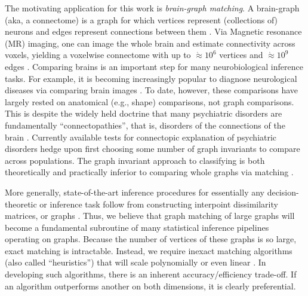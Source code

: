 \documentclass[11pt]{article}
\begin{document}
The motivating application for this work is \emph{brain-graph matching}.  A brain-graph (aka, a connectome) is a graph for which vertices represent (collections of) neurons and edges represent connections between them \cite{SpornsKotter05, Hagmann05}. Via  Magnetic resonance (MR) imaging, one can image the whole brain and estimate connectivity across voxels, yielding a voxelwise connectome with up to $\dot{\approx} 10^6$ vertices and $\dot{\approx} 10^9$ edges \cite{Zuo2011}.  Comparing brains is an important step for many neurobiological inference tasks.  For example, it is becoming increasingly popular to diagnose neurological diseases via comparing brain images \cite{Csernansky2004}.  To date, however, these comparisons have largely rested on anatomical (e.g., shape) comparisons, not graph comparisons.  This is despite the widely held doctrine that many
psychiatric disorders are fundamentally ``connectopathies'', that is, disorders of the connections of the brain \cite{Kubicki2007,Calhoun2011,Fornito2012,Fornito2012a}. Currently available tests for connectopic explanation of psychiatric disorders  hedge upon first choosing some number of graph invariants to compare across populations. The graph invariant approach to classifying is both theoretically and practically inferior to comparing whole graphs via matching \cite{VP11_unlabeled}.  

More generally, state-of-the-art inference procedures for essentially any decision-theoretic or inference task follow from constructing interpoint dissimilarity matrices, or graphs \cite{Duin2011}.  Thus, we believe that graph matching of large graphs will become a fundamental subroutine of many statistical inference pipelines operating on graphs. Because the number of vertices of these graphs is so large, exact matching is intractable.   Instead, we require inexact matching algorithms (also called ``heuristics'') that will scale polynomially or even linear \cite{Conte2004}.  In developing such algorithms, there is an inherent accuracy/efficiency trade-off.  If an algorithm outperforms another on both dimensions, it is clearly preferential.  
\end{document}

